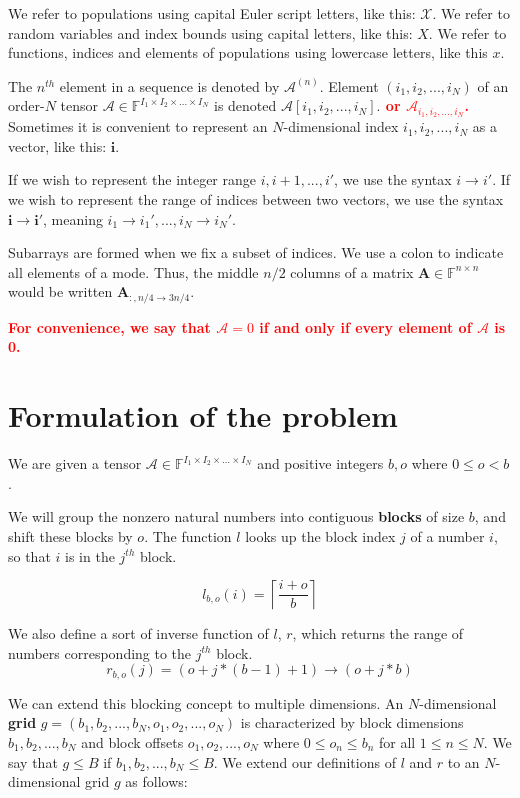 \documentclass[12pt]{article}
\theoremstyle{dfn}
\numberwithin{equation}{section}
\numberwithin{figure}{section}
\newcommand{\todo}[1] {\textbf{\textcolor{red}{#1}}}
\renewcommand{\vec}[1] {\mathbf{#1}}
\newcommand{\Mat}[1] {\mathbf{#1}}
\newcommand{\Ten}[1] {\mathbf{\mathcal{#1}}}
\newcommand{\Pop}[1] {\mathcal{#1}}
\newcommand{\F} {\mathbb{F}}
\begin{document}
    We refer to populations using capital Euler script letters, like this: $\Pop{X}$. We refer to random variables and index bounds using capital letters, like this: $X$. We refer to functions, indices and elements of populations using lowercase letters, like this $x$.

    The $n^{th}$ element in a sequence is denoted by $\Ten{A}^{(n)}$.
    Element $(i_1, i_2, ..., i_N)$ of an order-$N$ tensor $\Ten{A} \in \F^{I_1 \times I_2 \times ... \times I_N}$ is denoted $ \Ten{A}[i_1, i_2, ..., i_N]$.\todo{ or $\Ten{A}_{i_1, i_2, ..., i_N}$.}
    Sometimes it is convenient to represent an $N$-dimensional index $i_1, i_2, ..., i_N$ as a vector, like this: $\vec{i}$.

    If we wish to represent the integer range $i, i + 1, ..., i'$, we use the syntax $i \to i'$. If we wish to represent the range of indices between two vectors, we use the syntax $\vec{i} \to \vec{i}'$, meaning $i_1 \to i_1', ..., i_N \to i_N'$.

    Subarrays are formed when we fix a subset of indices. We use a colon to indicate all elements of a mode. Thus, the middle $n/2$ columns of a matrix $\Mat{A} \in \F^{n \times n}$ would be written $\Mat{A}_{:, n/4 \to 3n/4}$.

    \todo{For convenience, we say that $\Ten{A} = 0$ if and only if every element of $\Ten{A}$ is 0.}

  \section{Formulation of the problem}
    We are given a tensor $\Ten{A} \in \F^{I_1 \times I_2 \times ... \times I_N}$ and positive integers $b, o$ where $0 \leq o < b$.

    We will group the nonzero natural numbers into contiguous \textbf{blocks} of size $b$, and shift these blocks by $o$. The function $l$ looks up the block index $j$ of a number $i$, so that $i$ is in the $j^{th}$ block.

    \[
      l_{b, o}(i) = \left\lceil\frac{i + o}{b}\right\rceil
    \]

    We also define a sort of inverse function of $l$, $r$, which returns the range of numbers corresponding to the $j^{th}$ block.
    \[
      r_{b, o}(j) = (o + j * (b - 1) + 1) \to (o + j * b)
    \]

    We can extend this blocking concept to multiple dimensions. An $N$-dimensional \textbf{grid} $g = (b_1, b_2, ..., b_N, o_1, o_2, ..., o_N)$ is characterized by block dimensions $b_1, b_2, ..., b_N$ and block offsets $o_1, o_2, ..., o_N$ where $0 \leq o_n \leq b_n$ for all $1 \leq n \leq N$. We say that $g \leq B$ if $b_1, b_2, ..., b_N \leq B$. We extend our definitions of $l$ and $r$ to an $N$-dimensional grid $g$ as follows:
\end{document}
